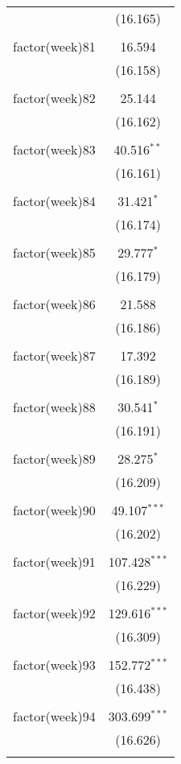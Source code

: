\documentclass{article}
\begin{document}
\begin{table}[!htbp]
\begin{tabular}{@{\extracolsep{5pt}}lc}
  & (16.165) \\ 
  & \\ 
 factor(week)81 & 16.594 \\ 
  & (16.158) \\ 
  & \\ 
 factor(week)82 & 25.144 \\ 
  & (16.162) \\ 
  & \\ 
 factor(week)83 & 40.516$^{**}$ \\ 
  & (16.161) \\ 
  & \\ 
 factor(week)84 & 31.421$^{*}$ \\ 
  & (16.174) \\ 
  & \\ 
 factor(week)85 & 29.777$^{*}$ \\ 
  & (16.179) \\ 
  & \\ 
 factor(week)86 & 21.588 \\ 
  & (16.186) \\ 
  & \\ 
 factor(week)87 & 17.392 \\ 
  & (16.189) \\ 
  & \\ 
 factor(week)88 & 30.541$^{*}$ \\ 
  & (16.191) \\ 
  & \\ 
 factor(week)89 & 28.275$^{*}$ \\ 
  & (16.209) \\ 
  & \\ 
 factor(week)90 & 49.107$^{***}$ \\ 
  & (16.202) \\ 
  & \\ 
 factor(week)91 & 107.428$^{***}$ \\ 
  & (16.229) \\ 
  & \\ 
 factor(week)92 & 129.616$^{***}$ \\ 
  & (16.309) \\ 
  & \\ 
 factor(week)93 & 152.772$^{***}$ \\ 
  & (16.438) \\ 
  & \\ 
 factor(week)94 & 303.699$^{***}$ \\ 
  & (16.626) \\ 
  & \\ 

\end{tabular}
\end{table}
\end{document}
